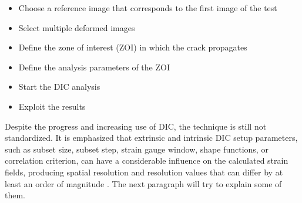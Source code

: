 \begin{itemize}
	\item Choose a reference image that corresponds to the first image of the test 
	\item Select multiple deformed images
	\item Define the zone of interest (ZOI) in which the crack propagates
	\item Define the analysis parameters of the ZOI
	\item Start the DIC analysis
	\item Exploit the results
\end{itemize}

Despite the progress and increasing use of DIC, the technique is still not standardized. It is emphasized that extrinsic and intrinsic DIC setup parameters, such as subset size, subset step, strain gauge window, shape functions, or correlation criterion, can have a considerable influence on the calculated strain fields, producing spatial resolution and resolution values that can differ by at least an order of magnitude \cite{DICguide2018}. The next paragraph will try to explain some of them. 

